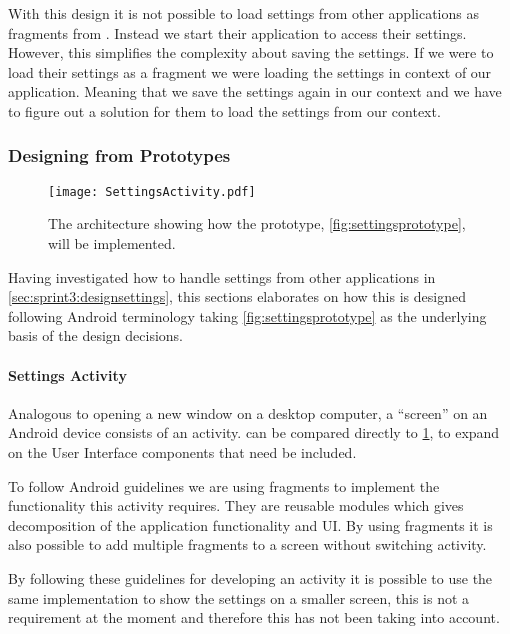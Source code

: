 With this design it is not possible to load settings from other applications as fragments from \launcher. Instead we start their application to access their settings.
However, this simplifies the complexity about saving the settings.
If we were to load their settings as a fragment we were loading the settings in context of our application. 
Meaning that we save the settings again in our context and we have to figure out a solution for them to load the settings from our context.

\subsubsection{Designing from Prototypes}

\begin{figure}[h]
\centering
\texttt{[image: SettingsActivity.pdf]}
\caption{The architecture showing how the prototype, \cref{fig:settingsprototype}, will be implemented.}
\label{fig:settingsarchitecture}
\end{figure}

Having investigated how to handle settings from other \giraf applications in \cref{sec:sprint3:designsettings}, this sections elaborates on how this is designed following Android terminology taking \cref{fig:settingsprototype} as the underlying basis of the design decisions.

\paragraph{Settings Activity}
Analogous to opening a new window on a desktop computer, a ``screen'' on an Android device consists of an activity.
 can be compared directly to \cref{fig:settingsarchitecture}, to expand on the User Interface components that need be included.

To follow Android guidelines we are using fragments\cite{fragments} to implement the functionality this activity requires. They are reusable modules which gives decomposition of the application functionality and UI. By using fragments it is also possible to add multiple fragments to a screen without switching activity.

By following these guidelines for developing an activity it is possible to use the same implementation to show the settings on a smaller screen, this is not a requirement at the moment and therefore this has not been taking into account.\\

